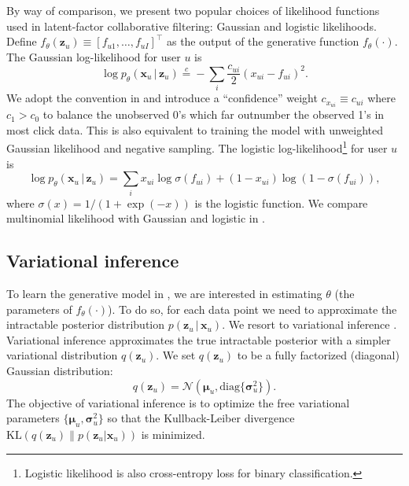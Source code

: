 \documentclass[sigconf]{acmart}
\newcommand{\mathbold}[1]{\ensuremath{\boldsymbol{\mathbf{#1}}}}
\DeclareRobustCommand{\mb}[1]{\ensuremath{\boldsymbol{\mathbf{#1}}}}
\newcommand{\mbx}{\mathbold{x}}
\newcommand{\mbz}{\mathbold{z}}
\newcommand{\g}{\,\vert\,}
\newcommand{\cN}{\mathcal{N}}
\DeclareRobustCommand{\mb}[1]{\mathbold{#1}}
\begin{document}
By way of comparison, we present two popular choices of likelihood functions used in latent-factor collaborative filtering: Gaussian and logistic likelihoods.
Define $f_\theta(\mbz_u) \equiv [f_{u1}, \dots, f_{uI}]^\top$ as the output of the generative function $f_\theta(\cdot)$. The Gaussian log-likelihood for user $u$ is
\begin{equation}\label{eq:gaussian}
\log p_\theta(\mbx_u \g \mbz_u) \overset{c}{=} -\sum_i \frac{c_{ui}}{2} (x_{ui} - f_{ui})^2.
\end{equation}
We adopt the convention in \citet{hu2008collaborative} and introduce a ``confidence'' weight $c_{x_{ui}} \equiv c_{ui}$ where $c_1 > c_0$ to balance the unobserved 0's which far outnumber the observed 1's in most click data. This is also equivalent to training the model with unweighted Gaussian likelihood and negative sampling. The logistic log-likelihood\footnote{Logistic likelihood is also cross-entropy loss for binary classification.} for user $u$ is 
\begin{equation}\label{eq:logistic}
\log p_\theta(\mbx_u \g \mbz_u) = \sum_i x_{ui} \log \sigma(f_{ui}) + (1 - x_{ui}) \log (1 - \sigma(f_{ui})),
\end{equation}
where $\sigma(x) = 1/(1 + \exp(-x))$ is the logistic function. We compare multinomial likelihood with Gaussian and logistic in .


\subsection{Variational inference} \label{sec:vi}

To learn the generative model in , we are interested in estimating 
$\theta$ (the parameters of $f_\theta(\cdot)$). To do so, for each data point we need to approximate the intractable posterior distribution $p(\mbz_{u} \g \mbx_{u})$.
We resort to variational inference \citep{jordan1999introduction}.
Variational inference approximates the true intractable posterior with a simpler variational distribution $q(\mbz_u)$. 
We set $q(\mbz_u)$ to be a fully factorized (diagonal) Gaussian distribution:
\[q(\mbz_u) = \cN(\mb\mu_u, \mathrm{diag}\{\mb\sigma_u^2\}).\]
The objective of variational inference is to optimize the free variational parameters $\{\mb\mu_u, \mb\sigma_u^2\}$ so that the Kullback-Leiber divergence $\mathrm{KL}(q(\mbz_u) \| p(\mbz_u | \mbx_u ))$ is minimized.

\end{document}
